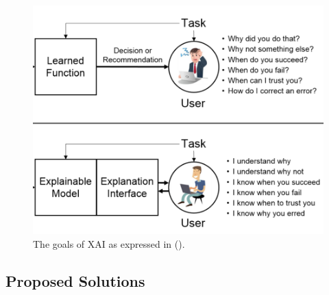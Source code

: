 \documentclass[conference]{IEEEtran}
\begin{document}
\begin{figure}[h!] \includegraphics[width=\linewidth]{images/xai.png}
    \caption{The goals of XAI as expressed in (\cite{DARPA}). } \label{fig:xai}
\end{figure}

\subsection{Proposed Solutions}
\label{sec:solutions}



\end{document}
